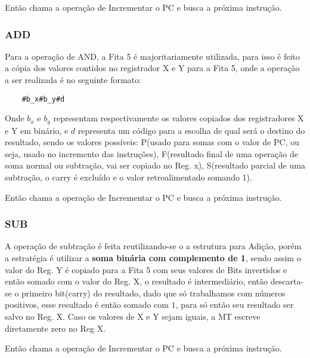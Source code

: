 \documentclass[a4paper,12pt]{article}
\begin{document}
Então chama a operação de Incrementar o PC e busca a próxima instrução.
\subsubsection*{ADD}

Para a operação de AND, a Fita 5 é majoritariamente utilizada, para isso é feito a cópia dos valores contidos no registrador X e Y para a Fita 5, onde a operação a ser realizada é no seguinte formato:
\begin{verbatim}
    #b_x#b_y#d
\end{verbatim}
Onde $b_x$ e $b_y$ representam respectivamente os valores copiados dos registradores X e Y em binário, e $d$ representa um código para a escolha de qual será o destino do resultado, sendo os valores possíveis: P(usado para somas com o valor de PC, ou seja, usado no incremento das instruções), F(resultado final de uma operação de soma normal ou subtração, vai ser copiado no Reg. x), S(resultado parcial de uma subtração, o carry é excluído e o valor retroalimentado somando 1).

Então chama a operação de Incrementar o PC e busca a próxima instrução.

\subsubsection*{SUB}

A operação de subtração é feita reutilizando-se o a estrutura para Adição, porém a estratégia é utilizar a \textbf{soma binária com complemento de 1}, sendo assim o valor do Reg. Y é copiado para a Fita 5 com seus valores de Bits invertidos e então somado com o valor do Reg. X, o resultado é intermediário, então descarta-se o primeiro bit(carry) do resultado, dado que só trabalhamos com números positivos, esse resultado é então somado com $1$, para só então seu resultado ser salvo no Reg. X. Caso os valores de X e Y sejam iguais, a MT escreve diretamente zero no Reg X.

Então chama a operação de Incrementar o PC e busca a próxima instrução.
\end{document}
